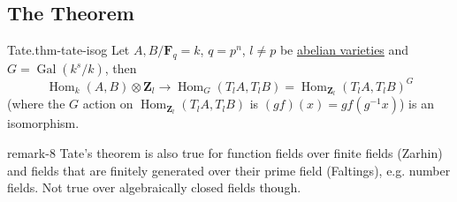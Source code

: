 \documentclass[10pt,]{book}
\numberwithin{equation}{section}
\newcommand{\ZZ}{\mathbf{Z}}
\newcommand{\FF}{\mathbf{F}}
\DeclareMathOperator{\Hom}{Hom}
\newcommand{\Gal}[2]{\operatorname{Gal}(#1/#2)}
\begin{document}
\subsection[{The Theorem}]{The Theorem}\label{subsection-30}
\begin{theorem}{Tate.}{}{thm-tate-isog}%
\hypertarget{p-376}{}%
Let \(A,B/\FF_q = k\), \(q = p^n\), \(l\ne p\) be \hyperref[def-buntes-abvar]{abelian varieties} and \(G = \Gal{k^s}{k}\), then%
\begin{equation*}
\Hom_{k}(A,B)\otimes \ZZ_l \to \Hom_G(T_l A, T_lB) = \Hom_{\ZZ_l}(T_lA,T_lB)^G
\end{equation*}
(where the \(G\) action on \(\Hom_{\ZZ_l}(T_l A, T_lB)\) is \((gf)(x) = gf(g^{-1}x)\)) is an isomorphism.%
\end{theorem}
\begin{remark}{}{remark-8}%
\hypertarget{p-377}{}%
Tate's theorem is also true for function fields over finite fields (Zarhin) and fields that are finitely generated over their prime field (Faltings), e.g. number fields. Not true over algebraically closed fields though.%
\end{remark}
%
%
\typeout{************************************************}
\typeout{************************************************}
%
\end{document}
